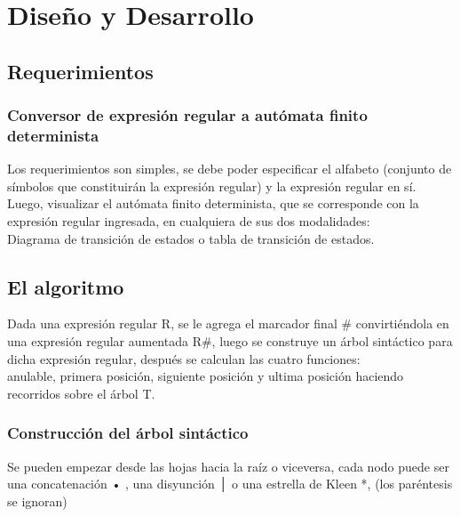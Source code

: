 \documentclass[a4paper,10pt]{article}
\begin{document}
 
\section{Diseño y Desarrollo}
\subsection{Requerimientos}
\subsubsection{Conversor de expresión regular a autómata finito determinista}
Los requerimientos son simples, se debe poder especificar el alfabeto (conjunto de símbolos que constituirán la expresión regular) y la expresión regular en sí.\\
Luego, visualizar el autómata finito determinista, que se corresponde con la expresión regular ingresada, en cualquiera de sus dos modalidades: \\
Diagrama de transición de estados o tabla de transición de estados.

\subsection{El algoritmo}
Dada una expresión regular R, se le agrega el marcador final # convirtiéndola en una expresión regular aumentada R#,
luego se construye un árbol sintáctico para dicha expresión regular, después se calculan las cuatro funciones: \\
anulable, primera posición, siguiente posición y ultima posición haciendo recorridos sobre el árbol T.
\subsubsection{Construcción del árbol sintáctico}
Se pueden empezar desde las hojas hacia la raíz o viceversa, cada nodo puede ser una concatenación • , una disyunción │ o una estrella de Kleen *, 
(los paréntesis se ignoran)
\end{document}
